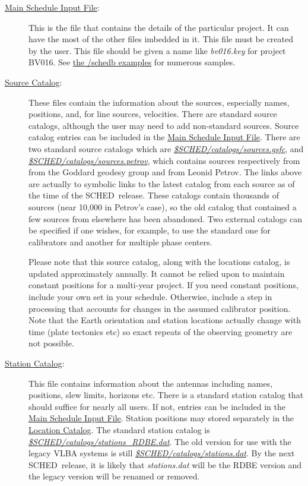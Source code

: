 \documentclass{report}
\newcommand{\schedb}{{\sc SCHED~}}
\begin{document}
\begin{description}

\item[
{\hyperref[SEC:SCHPAR]{Main Schedule Input File}}:] This is the
file that contains the details of the particular project.  It can have
the most of the other files imbedded in it.  This file must be created
by the user.  This file should be given a name like {\sl bv016.key}
for project BV016.  See 
{\href{examples}{the /schedb examples}} for numerous samples.



\item[ {\hyperref[SEC:SRCCAT]{Source Catalog}}:] These files contain
the information about the sources, especially names, positions, and,
for line sources, velocities.  There are standard source catalogs,
although the user may need to add non-standard sources.  Source
catalog entries can be included in the {\hyperref[SEC:SCHPAR]{Main
Schedule Input File}}.  There are two standard source catalogs which
are {\href{catalogs/sources.gsfc}{{\sl
\$SCHED/catalogs/sources.gsfc}}}, and
{\href{catalogs/sources.petrov}{{\sl
\$SCHED/catalogs/sources.petrov}}}, which contains sources
respectively from from the Goddard geodesy group and from Leonid
Petrov.  The links above are actually to symbolic links to the latest
catalog from each source as of the time of the \schedb release.  These
catalogs contain thousands of sources (near 10,000 in Petrov's case),
so the old catalog that contained a few sources from elsewhere has
been abandoned.  Two external catalogs can be specified if one wishes,
for example, to use the standard one for calibrators and another for
multiple phase centers.

Please note that this source catalog, along with the locations catalog, is
updated approximately annually.  It cannot be relied upon to maintain
constant positions for a multi-year project.  If you need constant
positions, include your own set in your schedule.  Otherwise, include
a step in processing that accounts for changes in the assumed
calibrator position.  Note that the Earth orientation and station
locations actually change with time (plate tectonics etc) so
exact repeats of the observing geometry are not possible.

\item[
{\hyperref[SEC:STACAT]{Station Catalog}}:] This file contains
information about the antennas including names, positions, slew
limits, horizons etc.  There is a standard station catalog that should
suffice for nearly all users.  If not, entries can be included in the
{\hyperref[SEC:SCHPAR]{Main Schedule Input File}}.  Station positions may
stored separately in the 
{\hyperref[SEC:STACAT]{Location Catalog}}.  The
standard station catalog is 
{\href{catalogs/stations\_RDBE.dat}{{\sl \$SCHED/catalogs/stations\_RDBE.dat}}}.
The old version for use with the legacy VLBA systems is still 
{\href{catalogs/stations.dat}{{\sl \$SCHED/catalogs/stations.dat}}}.
By the next \schedb release, it is likely that
{\sl stations.dat} will be the RDBE version
and the legacy version will be renamed or removed.


\end{description}
\end{document}
